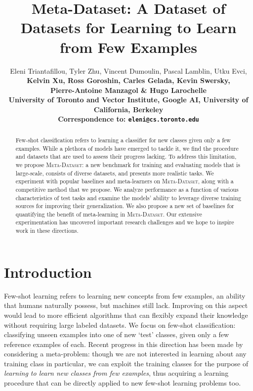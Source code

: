 \documentclass{article} \usepackage{iclr2020_conference,times}
\title{Meta-Dataset: A Dataset of Datasets for Learning to Learn from Few Examples}
\author{Eleni Triantafillou,
Tyler Zhu,
Vincent Dumoulin,
Pascal Lamblin,
Utku Evci, \\ \bf
Kelvin Xu,
Ross Goroshin,
Carles Gelada,
Kevin Swersky, \\ \bf
Pierre-Antoine Manzagol \&
Hugo Larochelle \\
University of Toronto and Vector Institute,
Google AI,
University of California, Berkeley \\
Correspondence to: \texttt{eleni@cs.toronto.edu} \\
}
\newcommand{\benchmark}{\textsc{Meta-Dataset}\xspace}
\begin{document}
\maketitle

\begin{abstract}
Few-shot classification refers to learning a classifier for new classes given
only a few examples. While a plethora of models have emerged to tackle it, we find the procedure and datasets that are used to assess their progress lacking. To address this limitation, we propose \benchmark: a new benchmark for training and evaluating models that is large-scale, consists of diverse datasets, and presents
more realistic tasks. We experiment with popular baselines and meta-learners on \benchmark, along with a competitive method that we propose. We analyze performance as a function of various characteristics of test tasks and examine the models' ability to leverage diverse training sources for improving their generalization. We also propose a new set of baselines for quantifying the benefit of meta-learning in \benchmark. Our extensive experimentation has uncovered important research challenges and we hope to inspire work in these directions. 
\end{abstract}

\section{Introduction}
Few-shot learning refers to learning new concepts from few examples, an ability
that humans naturally possess, but machines still lack. Improving on this
aspect would lead to more efficient algorithms that can flexibly expand their
knowledge without requiring large labeled datasets. We focus on
few-shot classification: classifying unseen examples into one of  new `test'
classes, given only a few reference examples of each. Recent progress
in this direction has been made by considering a meta-problem: though we are
not interested in learning about any training class in particular, we can exploit the training classes for the purpose of {\em learning to learn new
classes from few examples}, thus acquiring a learning procedure that can be
directly applied to new few-shot learning problems too.
\end{document}
